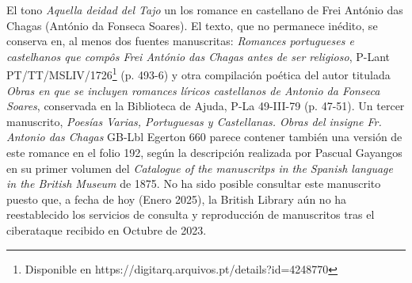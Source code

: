 
El tono \textit{Aquella deidad del Tajo} un los romance en castellano de Frei António das Chagas (António da Fonseca Soares). El texto, que no permanece inédito, se conserva en, al menos dos fuentes manuscritas: \textit{Romances portugueses e castelhanos que compôs Frei António das Chagas antes de ser religioso}, P-Lant PT/TT/MSLIV/1726\footnote{\textsuperscript{}Disponible en https://digitarq.arquivos.pt/details?id=4248770} (p. 493-6) y otra compilación poética del autor titulada \textit{Obras en que se incluyen romances líricos castellanos de Antonio da Fonseca Soares}, conservada en la Biblioteca de Ajuda, P-La 49-III-79 (p. 47-51). Un tercer manuscrito, \textit{Poesías Varias, Portuguesas y Castellanas. Obras del insigne Fr. Antonio das Chagas} GB-Lbl Egerton 660 parece contener también una versión de este romance en el folio 192, según la descripción realizada por Pascual Gayangos en su primer volumen del \textit{Catalogue of the manuscritps in the Spanish language in the British Museum} de 1875. No ha sido posible consultar este manuscrito puesto que, a fecha de hoy (Enero 2025), la British Library aún no ha reestablecido los servicios de consulta y reproducción de manuscritos tras el ciberataque recibido en Octubre de 2023.
